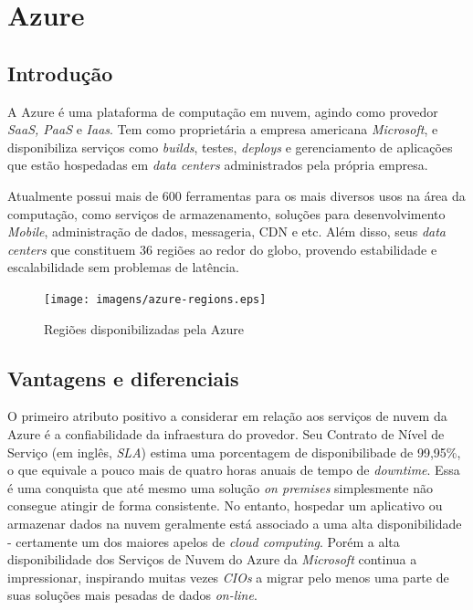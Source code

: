 \chapter{Azure}


\section{Introdução}
A Azure é uma plataforma de computação em nuvem, agindo como provedor \textit{SaaS, PaaS} e \textit{Iaas}. Tem como proprietária a empresa americana \textit{Microsoft}, e disponibiliza serviços como \textit{builds}, testes, \textit{deploys} e gerenciamento de aplicações que estão hospedadas em \textit{data centers} administrados pela própria empresa.

Atualmente possui mais de 600 ferramentas para os mais diversos usos na área da computação, como serviços de armazenamento, soluções para desenvolvimento \textit{Mobile}, administração de dados, messageria, CDN e etc. Além disso, seus \textit{data centers} que constituem 36 regiões ao redor do globo, provendo estabilidade e escalabilidade sem problemas de latência.

\begin{figure}[h!]
  \centering
  \texttt{[image: imagens/azure-regions.eps]}
  \caption{Regiões disponibilizadas pela Azure}
\end{figure}

\section{Vantagens e diferenciais}
O primeiro atributo positivo a considerar em relação aos serviços de nuvem da Azure é a confiabilidade da infraestura do provedor. Seu Contrato de Nível de Serviço (em inglês, \textit{SLA}) estima uma porcentagem de disponibilibade de 99,95\%, o que equivale a pouco mais de quatro horas anuais de tempo de \textit{downtime}. Essa é uma conquista que até mesmo uma solução \textit{on premises} simplesmente não consegue atingir de forma consistente. No entanto, hospedar um aplicativo ou armazenar dados na nuvem geralmente está associado a uma alta disponibilidade - certamente um dos maiores apelos de \textit{cloud computing}. Porém a alta disponibilidade dos Serviços de Nuvem do Azure da \textit{Microsoft} continua a impressionar, inspirando muitas vezes \textit{CIOs} a migrar pelo menos uma parte de suas soluções mais pesadas de dados \textit{on-line}.

